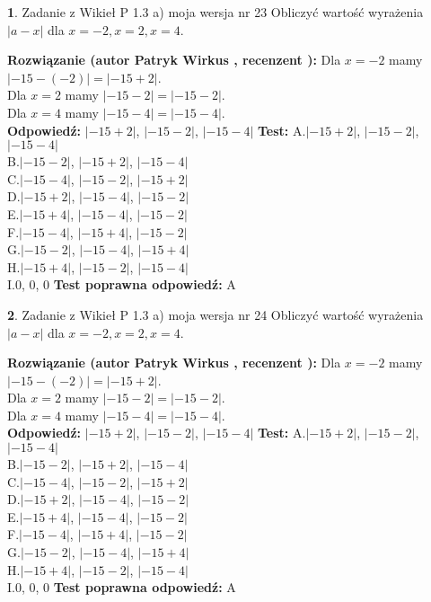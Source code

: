 \documentclass[12pt, a4paper]{article}
\theoremstyle{definition} %
\newtheorem{zad}{}
\newcommand{\zadStart}[1]{\begin{zad}#1\newline}
\newcommand{\zadStop}{\end{zad}}
\newcommand{\rozwStart}[2]{\noindent \textbf{Rozwiązanie (autor #1 , recenzent #2): }\newline}
\newcommand{\rozwStop}{\newline}
\newcommand{\odpStart}{\noindent \textbf{Odpowiedź:}\newline}
\newcommand{\odpStop}{\newline}
\newcommand{\testStart}{\noindent \textbf{Test:}\newline}
\newcommand{\testStop}{\newline}
\newcommand{\kluczStart}{\noindent \textbf{Test poprawna odpowiedź:}\newline}
\newcommand{\kluczStop}{\newline}
\begin{document}
\zadStart{Zadanie z Wikieł P 1.3 a) moja wersja nr 23}
Obliczyć wartość wyrażenia $|a - x|$ dla $x=-2,x=2,x=4$.
\zadStop
\rozwStart{Patryk Wirkus}{}
Dla $x = -2$ mamy $|-15 - (-2)| = |-15 + 2|$.\\
Dla $x = 2$ mamy $|-15 - 2| = |-15 - 2|$.\\
Dla $x = 4$ mamy $|-15 - 4| = |-15 - 4|$.\\
\rozwStop
\odpStart
$|-15 + 2|$, $|-15 - 2|$, $|-15 - 4|$
\odpStop
\testStart
A.$|-15 + 2|$, $|-15 - 2|$, $|-15 - 4|$\\
B.$|-15 - 2|$, $|-15 + 2|$, $|-15 - 4|$\\
C.$|-15 - 4|$, $|-15 - 2|$, $|-15 + 2|$\\
D.$|-15 + 2|$, $|-15 - 4|$, $|-15 - 2|$\\
E.$|-15 + 4|$, $|-15 - 4|$, $|-15 - 2|$\\
F.$|-15 - 4|$, $|-15 + 4|$, $|-15 - 2|$\\
G.$|-15 - 2|$, $|-15 - 4|$, $|-15 + 4|$\\
H.$|-15 + 4|$, $|-15 - 2|$, $|-15 - 4|$\\
I.$0$, $0$, $0$
\testStop
\kluczStart
A
\kluczStop



\zadStart{Zadanie z Wikieł P 1.3 a) moja wersja nr 24}
Obliczyć wartość wyrażenia $|a - x|$ dla $x=-2,x=2,x=4$.
\zadStop
\rozwStart{Patryk Wirkus}{}
Dla $x = -2$ mamy $|-15 - (-2)| = |-15 + 2|$.\\
Dla $x = 2$ mamy $|-15 - 2| = |-15 - 2|$.\\
Dla $x = 4$ mamy $|-15 - 4| = |-15 - 4|$.\\
\rozwStop
\odpStart
$|-15 + 2|$, $|-15 - 2|$, $|-15 - 4|$
\odpStop
\testStart
A.$|-15 + 2|$, $|-15 - 2|$, $|-15 - 4|$\\
B.$|-15 - 2|$, $|-15 + 2|$, $|-15 - 4|$\\
C.$|-15 - 4|$, $|-15 - 2|$, $|-15 + 2|$\\
D.$|-15 + 2|$, $|-15 - 4|$, $|-15 - 2|$\\
E.$|-15 + 4|$, $|-15 - 4|$, $|-15 - 2|$\\
F.$|-15 - 4|$, $|-15 + 4|$, $|-15 - 2|$\\
G.$|-15 - 2|$, $|-15 - 4|$, $|-15 + 4|$\\
H.$|-15 + 4|$, $|-15 - 2|$, $|-15 - 4|$\\
I.$0$, $0$, $0$
\testStop
\kluczStart
A
\kluczStop
\end{document}
